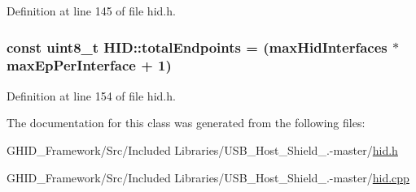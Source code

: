 \-Definition at line 145 of file hid.\-h.

\hypertarget{class_h_i_d_a884aa67312324e7d23a052a6dc80337e}{
\subsubsection[{total\-Endpoints}]{\setlength{\rightskip}{0pt plus 5cm}const uint8\-\_\-t {\bf \-H\-I\-D\-::total\-Endpoints} = ({\bf max\-Hid\-Interfaces} $\ast$ {\bf max\-Ep\-Per\-Interface} + 1)}}\label{class_h_i_d_a884aa67312324e7d23a052a6dc80337e}


\-Definition at line 154 of file hid.\-h.



\-The documentation for this class was generated from the following files\-:\begin{DoxyCompactItemize}
\item 
\-G\-H\-I\-D\-\_\-\-Framework/\-Src/\-Included Libraries/\-U\-S\-B\-\_\-\-Host\-\_\-\-Shield\-\_.-\/master/\hyperlink{hid_8h}{hid.\-h}\item 
\-G\-H\-I\-D\-\_\-\-Framework/\-Src/\-Included Libraries/\-U\-S\-B\-\_\-\-Host\-\_\-\-Shield\-\_.-\/master/\hyperlink{hid_8cpp}{hid.\-cpp}\end{DoxyCompactItemize}
